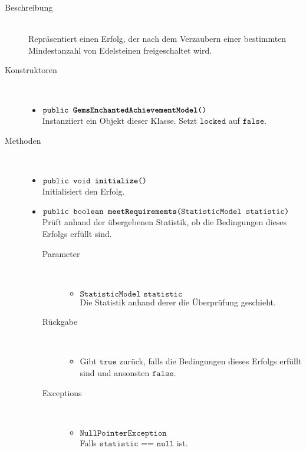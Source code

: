 \begin{description}
\item[Beschreibung] \hfill \\ Repräsentiert einen Erfolg, der nach dem Verzaubern einer bestimmten Mindestanzahl von Edelsteinen freigeschaltet wird.
	
\item[Konstruktoren] \hfill \\
	\vspace{-.8cm}
	\begin{itemize}
		\item $\texttt{public \textbf{GemsEnchantedAchievementModel}()}$ \\ Instanziiert ein Objekt dieser Klasse. Setzt $\texttt{locked}$ auf $\texttt{false}$.
	\end{itemize}
	
\item[Methoden] \hfill \\
	\vspace{-.8cm}
	\begin{itemize}
		\item $\texttt{public void \textbf{initialize}()}$ \\ Initialisiert den Erfolg.
		
		\item $\texttt{public boolean \textbf{meetRequirements}(StatisticModel statistic)}$ \\ Prüft anhand der übergebenen Statistik, ob die Bedingungen dieses Erfolgs erfüllt sind.
		\begin{description}
		\item[Parameter] \hfill \\
			\vspace{-.8cm}
			\begin{itemize}
				\item $\texttt{StatisticModel statistic}$ \\ Die Statistik anhand derer die Überprüfung geschieht. 
			\end{itemize}
			\item[Rückgabe] \hfill \\
			\vspace{-.8cm}
			\begin{itemize}
				\item Gibt $\texttt{true}$ zurück, falls die Bedingungen dieses Erfolgs erfüllt sind und ansonsten $\texttt{false}$.
			\end{itemize}
			\item[Exceptions] \hfill \\
			\vspace{-.8cm}
			\begin{itemize}
				\item $\texttt{NullPointerException}$ \\ Falls $\texttt{statistic == null}$ ist.
			\end{itemize}
		\end{description}
		
	\end{itemize}
\end{description}

